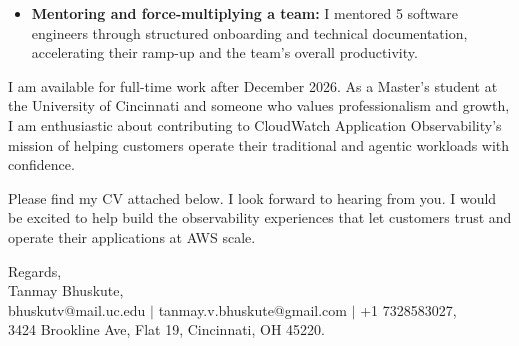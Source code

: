 \documentclass[11pt]{letter}
\begin{document}
\begin{letter}{}
\begin{itemize}[leftmargin=*, itemsep=0.45em]
    \item \textbf{Mentoring and force-multiplying a team:} I mentored 5 software engineers through structured onboarding and technical documentation, accelerating their ramp-up and the team's overall productivity.
\end{itemize}

I am available for full-time work after December 2026. As a Master's student at the University of Cincinnati and someone who values professionalism and growth, I am enthusiastic about contributing to CloudWatch Application Observability's mission of helping customers operate their traditional and agentic workloads with confidence.

Please find my CV attached below. I look forward to hearing from you. I would be excited to help build the observability experiences that let customers trust and operate their applications at AWS scale.

{\setlength{\parskip}{0pt}
Regards,\\
Tanmay Bhuskute,\\
bhuskutv@mail.uc.edu $\mid$ tanmay.v.bhuskute@gmail.com $\mid$ +1 7328583027,\\
3424 Brookline Ave, Flat 19, Cincinnati, OH 45220.
}

\end{letter}
\end{document}
